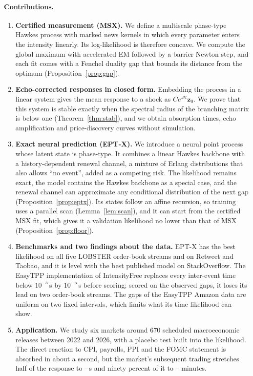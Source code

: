 \paragraph{Contributions.}
\begin{enumerate}
\item \textbf{Certified measurement (MSX).} We define a multiscale phase-type Hawkes process
with marked news kernels in which every parameter enters the intensity linearly. Its
log-likelihood is therefore concave. We compute the global maximum with accelerated EM followed
by a barrier Newton step, and each fit comes with a Fenchel duality gap that bounds its distance
from the optimum (Proposition~\ref{prop:gap}).
\item \textbf{Echo-corrected responses in closed form.} Embedding the process in a linear
system gives the mean response to a shock as $C e^{\mathcal A t}\bm z_0$. We prove that this
system is stable exactly when the spectral radius of the branching matrix is below one
(Theorem~\ref{thm:stab}), and we obtain absorption times, echo amplification and price-discovery
curves without simulation.
\item \textbf{Exact neural prediction (EPT-X).} We introduce a neural point process whose latent
state is phase-type. It combines a linear Hawkes backbone with a history-dependent renewal
channel, a mixture of Erlang distributions that also allows ``no event'', added as a competing
risk. The likelihood remains exact, the model contains the Hawkes backbone as a special case,
and the renewal channel can approximate any conditional distribution of the next gap
(Proposition~\ref{prop:eptx}). Its states follow an affine recursion, so training uses a parallel
scan (Lemma~\ref{lem:scan}), and it can start from the certified MSX fit, which gives it a
validation likelihood no lower than that of MSX (Proposition~\ref{prop:floor}).
\item \textbf{Benchmarks and two findings about the data.} EPT-X has the best likelihood on all
five LOBSTER order-book streams and on Retweet and Taobao, and it is level with the best published
model on StackOverflow. The EasyTPP implementation of IntensityFree replaces every inter-event time
below $10^{-5}$\,s by $10^{-5}$\,s before scoring; scored on the observed gaps, it loses its lead on
two order-book streams. The gaps of the EasyTPP Amazon data are uniform on two fixed intervals,
which limits what its time likelihood can show.
\item \textbf{Application.} We study six markets around 670 scheduled macroeconomic releases
between 2022 and 2026, with a placebo test built into the likelihood. The direct reaction to
CPI, payrolls, PPI and the FOMC statement is absorbed in about a second, but the market's
subsequent trading stretches half of the response to \tEchoLo--\tEchoHi{}\,s and ninety percent
of it to \tNinetyLo--\tNinetyHi{} minutes.
\end{enumerate}

